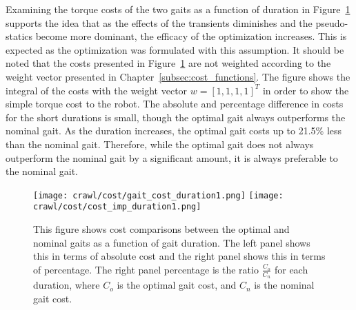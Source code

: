 Examining the torque costs of the two gaits as a function of duration
in Figure~\ref{fig:cost_duration1} supports
the idea that as the effects of the transients diminishes and the pseudo-statics
become more dominant, the efficacy of the optimization increases.
This is expected as the optimization was formulated with this assumption. 
It should be noted that the costs presented in Figure~\ref{fig:cost_duration1}
are not weighted according to the weight vector presented in Chapter~\ref{subsec:cost_functions}.
The figure shows the integral of the costs with the weight vector $w = [1, 1, 1, 1]^T$
in order to show the simple torque cost to the robot. 
The absolute and percentage difference in costs for the short durations is small,
though the optimal gait always outperforms the nominal gait.
As the duration increases, the optimal gait costs up to 21.5\% less than the
nominal gait. Therefore, while the optimal gait does not always outperform the
nominal gait by a significant amount, it is always preferable to the nominal gait.

\begin{figure}
\texttt{[image: crawl/cost/gait\_cost\_duration1.png]}
\texttt{[image: crawl/cost/cost\_imp\_duration1.png]}
\caption{This figure shows cost comparisons between the optimal and
         nominal gaits as a function of gait duration. The left panel shows
         this in terms of absolute cost and the right panel shows this in 
         terms of percentage. The right panel percentage is the ratio $\frac{C_o}{C_n}$
         for each duration, where $C_o$ is the optimal gait cost, and $C_n$ is the nominal gait cost.}
\label{fig:cost_duration1}
\end{figure}
